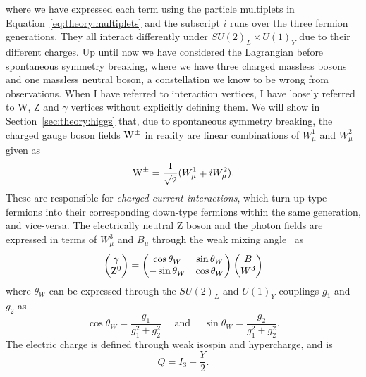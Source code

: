 where we have expressed each term using the particle multiplets in Equation~\ref{eq:theory:multiplets} and the subscript $i$ runs over the three fermion generations. They all interact differently under $SU(2)_L \times U(1)_Y$ due to their different charges.\newline
Up until now we have considered the Lagrangian before spontaneous symmetry breaking, where we have three charged massless bosons and one massless neutral boson, a constellation we know to be wrong from observations. When I have referred to interaction vertices, I have loosely referred to W, Z and $\gamma$ vertices without explicitly defining them. We will show in Section~\ref{sec:theory:higgs} that, due to spontaneous symmetry breaking, the charged gauge boson fields $\mathrm{W}^{\pm}$ in reality are linear combinations of $W_{\mu}^1$ and $W_{\mu}^2$ given as
\begin{equation}
\mathrm{W}^{\pm} = \frac{1}{\sqrt{2}}(W_{\mu}^1 \mp iW_{\mu}^2).
\end{equation}
These are responsible for \emph{charged-current interactions}, which turn up-type fermions into their corresponding down-type fermions within the same generation, and vice-versa. The electrically neutral Z boson and the photon fields are expressed in terms of $W_{\mu}^3$ and $B_{\mu}$ through the weak mixing angle~\cite{Weinberg:1979pi} as
\begin{equation}
\begin{pmatrix} \gamma \\ \mathrm{Z}^0 \end{pmatrix}
  = \begin{pmatrix} \cos \theta_W & \sin \theta_W \\
                   -\sin \theta_W & \cos \theta_W \end{pmatrix}
  \begin{pmatrix} B \\ W^3 \end{pmatrix}                   
\end{equation}
where $\theta_W$ can be expressed through the $SU (2)_L$ and $U(1)_Y$ couplings $g_1$ and $g_2$ as
\begin{equation}
     \cos \theta_W = \frac{g_1}{g^2_1+g^2_2}  \quad \textrm{ and } \quad \sin \theta_W = \frac{g_2}{g^2_1+g^2_2}.        
\end{equation}
The electric charge is defined through weak isospin and hypercharge, and is
\begin{equation}
  Q = I_3 + \frac{Y}{2}.
  \end{equation}
